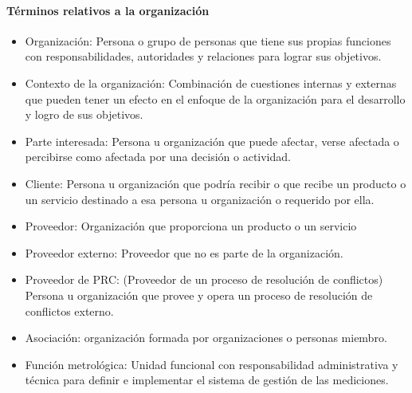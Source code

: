 		\paragraph{Términos relativos a la organización}
			\begin{itemize}
				\item Organización: Persona o grupo de personas que tiene sus propias funciones con responsabilidades, autoridades y
				relaciones para lograr sus objetivos.
				
				\item Contexto de la organización: Combinación de cuestiones internas y externas que pueden tener un efecto en el enfoque de la
				organización para el desarrollo y logro de sus objetivos.
				
				\item Parte interesada: Persona u organización que puede afectar, verse afectada o percibirse como afectada por una
				decisión o actividad.
				
				\item Cliente: Persona u organización  que podría recibir o que recibe un producto o un servicio
				destinado a esa persona u organización o requerido por ella.
				
				\item Proveedor: Organización que proporciona un producto o un servicio
				
				\item Proveedor externo: Proveedor que no es parte de la organización.
				
				\item Proveedor de PRC: (Proveedor de un proceso de resolución de conflictos)
				Persona u organización que provee y opera un proceso de resolución de conflictos externo.
				
				\item Asociación:  organización formada por organizaciones o personas miembro. 
				
				\item Función metrológica: Unidad funcional con responsabilidad administrativa y técnica para definir e implementar el sistema de
				gestión de las mediciones.
				
			\end{itemize}
		
		\newpage
		\thispagestyle{plain}
		

